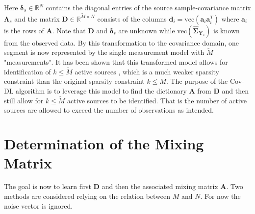 Here $\boldsymbol{\delta}_s \in \mathbb{R}^{N}$ contains the diagonal entries of the source sample-covariance matrix $\boldsymbol{\Lambda}_s$
and the matrix $\mathbf{D} \in \mathbb{R}^{\widetilde{M} \times N}$ consists of the columns $\mathbf{d}_i = \text{vec}(\mathbf{a}_i \mathbf{a}_i^T)$ where $\mathbf{a}_i$ is the rows of $\mathbf{A}$. Note that $\mathbf{D}$ and $\boldsymbol{\delta}_s$ are unknown while $\text{vec}(\widehat{\boldsymbol{\Sigma}}_{\mathbf{Y}_s})$ is known from the observed data.
By this transformation to the covariance domain, one segment is now represented by the single measurement model with $\widetilde{M}$ "measurements". 
It has been shown that this transformed model allows for identification of $k \leq \widetilde{M}$ active sources \cite{Pal2015}, which is a much weaker sparsity constraint than the original sparsity constraint $k \leq M$. 
The purpose of the Cov-DL algorithm is to leverage this model to find the dictionary $\mathbf{A}$ from $\mathbf{D}$ and then still allow for $k \leq \widetilde{M}$ active sources to be identified. 
That is the number of active sources are allowed to exceed the number of observations as intended.

\section{Determination of the Mixing Matrix}
The goal is now to learn first $\textbf{D}$ and then the associated mixing matrix $\textbf{A}$. 
Two methods are considered relying on the relation between $M$ and $N$. 
For now the noise vector is ignored.





